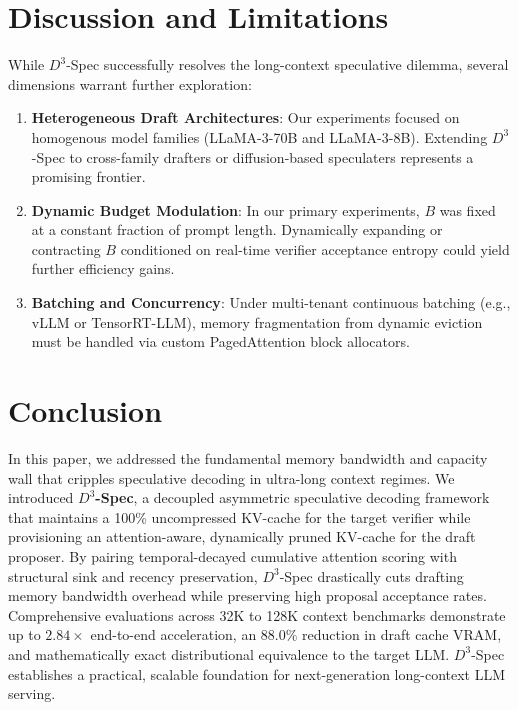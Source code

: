 \documentclass[runningheads]{llncs}
\begin{document}
\section{Discussion and Limitations}
\label{sec:discussion}

While $D^3$-Spec successfully resolves the long-context speculative dilemma, several dimensions warrant further exploration:
\begin{enumerate}
    \item \textbf{Heterogeneous Draft Architectures}: Our experiments focused on homogenous model families (LLaMA-3-70B and LLaMA-3-8B). Extending $D^3$-Spec to cross-family drafters or diffusion-based speculaters represents a promising frontier.
    \item \textbf{Dynamic Budget Modulation}: In our primary experiments, $B$ was fixed at a constant fraction of prompt length. Dynamically expanding or contracting $B$ conditioned on real-time verifier acceptance entropy could yield further efficiency gains.
    \item \textbf{Batching and Concurrency}: Under multi-tenant continuous batching (e.g., vLLM or TensorRT-LLM), memory fragmentation from dynamic eviction must be handled via custom PagedAttention block allocators.
\end{enumerate}

\section{Conclusion}
\label{sec:conclusion}

In this paper, we addressed the fundamental memory bandwidth and capacity wall that cripples speculative decoding in ultra-long context regimes. We introduced \textbf{$D^3$-Spec}, a decoupled asymmetric speculative decoding framework that maintains a 100\% uncompressed KV-cache for the target verifier while provisioning an attention-aware, dynamically pruned KV-cache for the draft proposer. By pairing temporal-decayed cumulative attention scoring with structural sink and recency preservation, $D^3$-Spec drastically cuts drafting memory bandwidth overhead while preserving high proposal acceptance rates. Comprehensive evaluations across 32K to 128K context benchmarks demonstrate up to $2.84\times$ end-to-end acceleration, an $88.0\%$ reduction in draft cache VRAM, and mathematically exact distributional equivalence to the target LLM. $D^3$-Spec establishes a practical, scalable foundation for next-generation long-context LLM serving.
\end{document}
